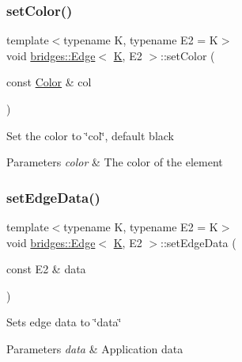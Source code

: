\subsubsection{\texorpdfstring{setColor()}{setColor()}}
{\footnotesize\ttfamily template$<$typename K, typename E2 = K$>$ \\
void \mbox{\hyperlink{classbridges_1_1_edge}{bridges\+::\+Edge}}$<$ \mbox{\hyperlink{namespacebridges_acfb0a4f7877d8f63de3e6862004c50edaa5f3c6a11b03839d46af9fb43c97c188}{K}}, E2 $>$\+::set\+Color (\begin{DoxyParamCaption}\item[{const \mbox{\hyperlink{classbridges_1_1_color}{Color}} \&}]{col }\end{DoxyParamCaption})\hspace{0.3cm}{\ttfamily [inline]}}

Set the color to \char`\"{}col\char`\"{}, default black


\begin{DoxyParams}{Parameters}
{\em color} & The color of the element \\
\hline
\end{DoxyParams}
\mbox{\label{classbridges_1_1_edge_a0f4b37731a5510b46709b095fa6eefb5}} 
\subsubsection{\texorpdfstring{setEdgeData()}{setEdgeData()}}
{\footnotesize\ttfamily template$<$typename K, typename E2 = K$>$ \\
void \mbox{\hyperlink{classbridges_1_1_edge}{bridges\+::\+Edge}}$<$ \mbox{\hyperlink{namespacebridges_acfb0a4f7877d8f63de3e6862004c50edaa5f3c6a11b03839d46af9fb43c97c188}{K}}, E2 $>$\+::set\+Edge\+Data (\begin{DoxyParamCaption}\item[{const E2 \&}]{data }\end{DoxyParamCaption})\hspace{0.3cm}{\ttfamily [inline]}}

Sets edge data to \char`\"{}data\char`\"{} 
\begin{DoxyParams}{Parameters}
{\em data} & Application data \\
\hline
\end{DoxyParams}
\mbox{\label{classbridges_1_1_edge_a2494d3e0e396663470310ce15a9e0b57}} 
